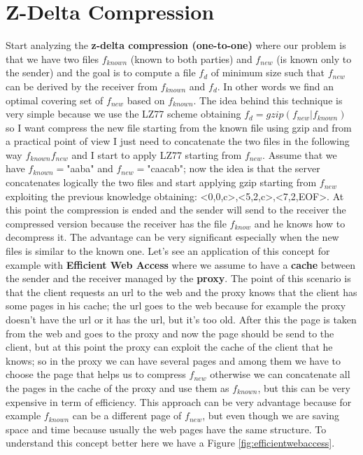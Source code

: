 \section{Z-Delta Compression}
Start analyzing the \textbf{z-delta compression (one-to-one)} where our problem is that we have two files $f_{known}$ (known to both parties) and $f_{new}$ (is known only to the sender) and the goal is to compute a file $f_d$ of minimum size such that $f_{new}$ can be derived by the receiver from $f_{known}$ and $f_d$. In other words we find an optimal covering set of $f_{new}$ based on $f_{known}$.\newline
The idea behind this technique is very simple because we use the LZ77 scheme obtaining $f_d=gzip(f_{new}|f_{known})$ so I want compress the new file starting from the known file using gzip and from a practical point of view I just need to concatenate the two files in the following way $f_{known}f_{new}$ and I start to apply LZ77 starting from $f_{new}$.\newline
Assume that we have $f_{known}=$"aaba" and $f_{new}=$"caacab"; now the idea is that the server concatenates logically the two files and start applying gzip starting from $f_{new}$ exploiting the previous knowledge obtaining: <0,0,c>,<5,2,c>,<7,2,EOF>. At this point the compression is ended and the sender will send to the receiver the compressed version because the receiver has the file $f_{know}$ and he knows how to decompress it. The advantage can be very significant especially when the new files is similar to the known one.\newline
Let's see an application of this concept for example with \textbf{Efficient Web Access} where we assume to have a \textbf{cache} between the sender and the receiver managed by the \textbf{proxy}. The point of this scenario is that the client requests an url to the web and the proxy knows that the client has some pages in his cache; the url goes to the web because for example the proxy doesn't have the url or it has the url, but it's too old. After this the page is taken from the web and goes to the proxy and now the page should be send to the client, but at this point the proxy can exploit the cache of the client that he knows; so in the proxy we can have several pages and among them we have to choose the page that helps us to compress $f_{new}$ otherwise we can concatenate all the pages in the cache of the proxy and use them as $f_{known}$, but this can be very expensive in term of efficiency. This approach can be very advantage because for example $f_{known}$ can be a different page of $f_{new}$, but even though we are saving space and time because usually the web pages have the same structure. To understand this concept better here we have a Figure \ref{fig:efficientwebaccess}.\newline
